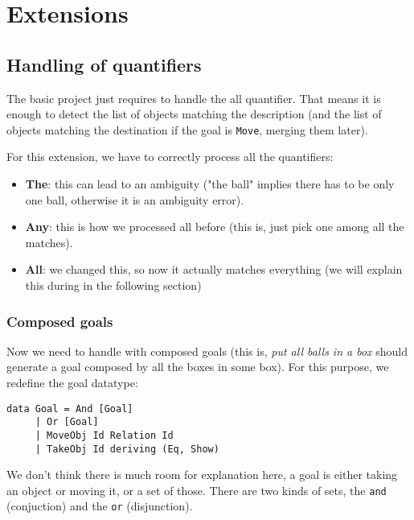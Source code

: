 \documentclass[11pt]{article}
\begin{document}
	\section{Extensions}

	\subsection{Handling of quantifiers}

          The basic project just requires to handle the all quantifier.
          That means it is enough to detect the list of objects matching the description
          (and the list of objects matching the destination if the goal is \texttt{Move},
          merging them later).

          For this extension, we have to correctly process all the quantifiers:

          \begin{itemize}
            \item {\bf The}: this can lead to an ambiguity ("the ball" implies there has
            to be only one ball, otherwise it is an ambiguity error).
            \item {\bf Any}: this is how we processed all before (this is, just pick one
            among all the matches).
            \item {\bf All}: we changed this, so now it actually matches everything 
            (we will explain this during in the following section)
          \end{itemize}

          \subsubsection{Composed goals}
          Now we need to handle with composed goals (this is, \textit{put all balls
          in a box} should generate a goal composed by all the boxes in some box). For 
          this purpose, we redefine the goal datatype:

\begin{lstlisting}
data Goal = And [Goal]
     | Or [Goal]
     | MoveObj Id Relation Id
     | TakeObj Id deriving (Eq, Show)
\end{lstlisting}

          We don't think there is much room for explanation here, a goal is either 
          taking an object or moving it, or a set of those. There are two kinds of 
          sets, the \texttt{and} (conjuction) and the \texttt{or} (disjunction).
\end{document}
